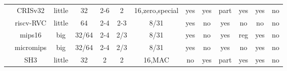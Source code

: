\begin{sidewaystable}[tbp]
\begin{sf}
\begin{footnotesize}
\begin{center}
\begin{tabular}{|c|c||c|c|c|c|c|c|c|c|c|c|c|}
                 & %
CRISv32          & %
little           & %
32               & %
2-6              & %
2                & %
16,zero,special  & %
yes              & %
yes              & %
part             & %
yes              & %
yes              & %
no                 %
\\
\cline{2-13}

		 & %
riscv-RVC        & %
little           & %
64               & %
2-4              & %
2-3              & %
8/31             & %
yes              & %
no               & %
yes              & %
no               & %
no               & %
no                 %
\\
\cline{2-13}


		 & %
mips16           & %
big              & %
32/64            & %
2-4              & %
2/3              & %
8/31             & %
yes              & %
no               & %
yes              & %
reg              & %
yes              & %
no                 %
\\
\cline{2-13}

		 & %
micromips           & %
big              & %
32/64            & %
2-4              & %
2/3              & %
8/31             & %
yes              & %
no               & %
yes              & %
no               & %
yes              & %
no                 %
\\
\cline{2-13}


                 & %
SH3              & %
little           & %
32               & %
2                & %
2                & %
16,MAC           & %
no               & %
yes              & %
part             & %
yes              & %
yes              & %
no                 %
\\
\cline{2-13}


\end{tabular}
\end{center}
\end{footnotesize}
\end{sf}
\end{sidewaystable}
